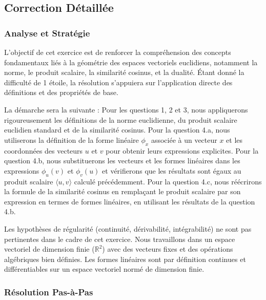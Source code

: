 \documentclass[11pt,a4paper]{report}
\begin{document}
\hypertarget{correction-duxe9tailluxe9e}{%
\subsection{Correction Détaillée}\label{correction-duxe9tailluxe9e}}

\hypertarget{analyse-et-stratuxe9gie}{%
\subsubsection{Analyse et Stratégie}\label{analyse-et-stratuxe9gie}}

L'objectif de cet exercice est de renforcer la compréhension des
concepts fondamentaux liés à la géométrie des espaces vectoriels
euclidiens, notamment la norme, le produit scalaire, la similarité
cosinus, et la dualité. Étant donné la difficulté de 1 étoile, la
résolution s'appuiera sur l'application directe des définitions et des
propriétés de base.

La démarche sera la suivante : Pour les questions 1, 2 et 3, nous
appliquerons rigoureusement les définitions de la norme euclidienne, du
produit scalaire euclidien standard et de la similarité cosinus. Pour la
question 4.a, nous utiliserons la définition de la forme linéaire
\(\phi_x\) associée à un vecteur \(x\) et les coordonnées des vecteurs
\(u\) et \(v\) pour obtenir leurs expressions explicites. Pour la
question 4.b, nous substituerons les vecteurs et les formes linéaires
dans les expressions \(\phi_u(v)\) et \(\phi_v(u)\) et vérifierons que
les résultats sont égaux au produit scalaire \(\langle u, v \rangle\)
calculé précédemment. Pour la question 4.c, nous réécrirons la formule
de la similarité cosinus en remplaçant le produit scalaire par son
expression en termes de formes linéaires, en utilisant les résultats de
la question 4.b.

Les hypothèses de régularité (continuité, dérivabilité, intégrabilité)
ne sont pas pertinentes dans le cadre de cet exercice. Nous travaillons
dans un espace vectoriel de dimension finie (\(\mathbb{R}^2\)) avec des
vecteurs fixes et des opérations algébriques bien définies. Les formes
linéaires sont par définition continues et différentiables sur un espace
vectoriel normé de dimension finie.

\hypertarget{ruxe9solution-pas-uxe0-pas}{%
\subsubsection{Résolution Pas-à-Pas}\label{ruxe9solution-pas-uxe0-pas}}
\end{document}
